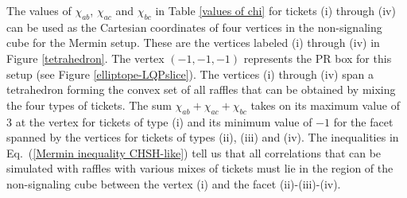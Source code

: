 The values of $\chi_{ab}$,  $\chi_{ac}$ and $\chi_{bc}$ in Table \ref{values of chi} for tickets (i) through (iv) can be used as the Cartesian coordinates of four vertices in the non-signaling cube for the Mermin setup. These are the vertices labeled (i) through (iv) in Figure \ref{tetrahedron}. The vertex $(-1, -1, -1)$ represents the PR box for this setup (see Figure \ref{elliptope-LQPslice}). The vertices (i) through (iv) span a tetrahedron forming the convex set of all raffles that can be obtained by mixing the four types of tickets. The sum $\chi_{ab} + \chi_{ac} + \chi_{bc}$ takes on its maximum value of 3 at the vertex for tickets of type (i) and its minimum value of $-1$ for the facet spanned by the vertices for tickets of types (ii), (iii) and (iv). The inequalities in Eq.\ (\ref{Mermin inequality CHSH-like}) tell us that all correlations that can be simulated with raffles with various mixes of tickets must lie in the region of the non-signaling cube between the vertex (i) and the facet (ii)-(iii)-(iv). 

